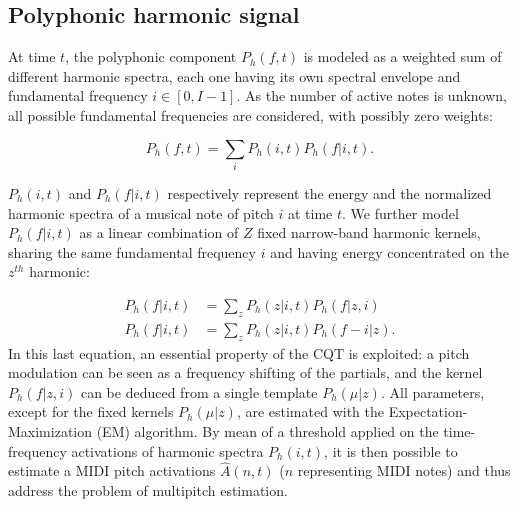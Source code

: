 \documentclass{article}
\begin{document}
\subsection{Polyphonic harmonic signal}
At time $t$, the polyphonic component $P_h(f,t)$ is modeled as a weighted sum of different harmonic spectra, each one having its own spectral envelope and fundamental frequency $i \in \left[ 0, I-1 \right]$. As the number of active notes is unknown, all possible fundamental frequencies are considered, with possibly zero weights:

\vspace{0.2cm}

\begin{equation}
P_h(f,t) = \sum_i P_h(i,t)P_h(f|i,t).
\end{equation}

$P_h(i,t)$ and $P_h(f|i,t)$ respectively represent the energy and the normalized harmonic spectra of a musical note of pitch $i$ at time $t$. We further model $P_h(f|i,t)$ as a linear combination of $Z$ fixed narrow-band harmonic kernels, sharing the same fundamental frequency $i$ and having energy concentrated on the $z^{th}$ harmonic:

\begin{align}
P_h(f|i,t) & = \sum_z P_h(z|i,t)P_h(f|z,i) \\
P_h(f|i,t) & = \sum_z P_h(z|i,t)P_h(f-i|z).
\end{align}
In this last equation, an essential property of the CQT is exploited: a pitch modulation can be seen as a frequency shifting of the partials, and the kernel $P_h(f|z,i)$ can be deduced from a single template $P_h(\mu|z)$.
All parameters, except for the fixed kernels $P_h(\mu|z)$, are estimated with the Expectation-Maximization (EM) algorithm. By mean of a threshold applied on the time-frequency activations of harmonic spectra $P_h(i,t)$, it is then possible to estimate a MIDI pitch activations $\hat{A}(n,t)$ ($n$ representing MIDI notes) and thus address the problem of multipitch estimation.
\end{document}
